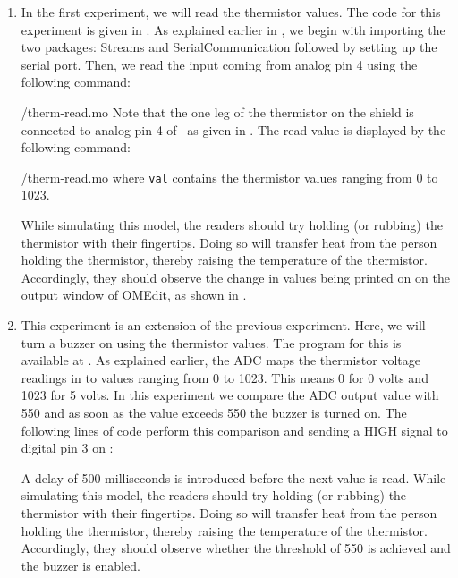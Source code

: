 \begin{enumerate}
  \item In the first experiment, we will read the thermistor values. The code for this experiment is given in
        . As explained earlier in ,
        we begin with importing the two packages: Streams and SerialCommunication followed
        by setting up the serial port. Then, we read the input coming from analog pin 4 using the
        following command:
        
        {\LocTHERMOpenModelicacode/therm-read.mo} Note that the one leg of the thermistor on
        the shield is connected to analog pin 4 of \arduino\,
        as given in . The read value is displayed
        by the following command:
        
        {\LocTHERMOpenModelicacode/therm-read.mo} where {\tt val} contains
        the thermistor values ranging from 0 to 1023.

        While simulating this model,
        the readers should try holding (or rubbing) the thermistor with their fingertips.
        Doing so will transfer heat from the person holding the
        thermistor, thereby raising the temperature of the thermistor.
        Accordingly, they should observe the change in values being printed on on the output window of OMEdit, as shown in .

  \item This experiment is an extension of the previous experiment. Here,
        we will turn a buzzer on using the thermistor values.
        The program for this is available at
        .  As explained earlier,
        the ADC maps the thermistor voltage readings in to values
        ranging from 0 to 1023. This means 0 for 0 volts and 1023 for 5
        volts. In this experiment we compare the ADC output value with 550
        and as soon as the value exceeds 550 the buzzer is turned on. The following lines of code perform this
        comparison and sending a {HIGH} signal to digital pin 3 on \arduino:
        
        A delay of 500 milliseconds is introduced
        before the next value is read. While simulating this model, 
        the readers should try holding (or rubbing) the thermistor with their fingertips.
        Doing so will transfer heat from the person holding the
        thermistor, thereby raising the temperature of the thermistor.
        Accordingly, they should observe whether the threshold of 550 is achieved
        and the buzzer is enabled.


\end{enumerate}
